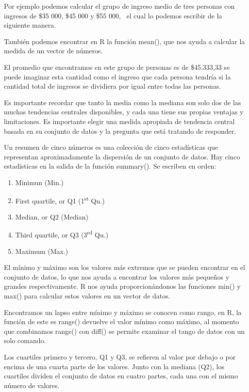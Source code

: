 \documentclass[
  letterpaper,
  DIV=11,
  numbers=noendperiod]{scrartcl}
\providecommand{\tightlist}{%
  \setlength{\itemsep}{0pt}\setlength{\parskip}{0pt}}\usepackage{longtable,booktabs,array}
\begin{document}
Por ejemplo podemos calcular el grupo de ingreso medio de tres personas
con ingresos de \$35 000, \$45 000 y \$55 000,~ el cual lo podemos
escribir de la siguiente manera.

También podemos encontrar en R la función mean(), que nos ayuda a
calcular la medida de un vector de números.

El promedio que encontramos en este grupo de personas es de \$45.333,33
se puede imaginar esta cantidad como el ingreso que cada persona tendría
si la cantidad total de ingresos se dividiera por igual entre todas las
personas.

Es importante recordar que tanto la media como la mediana son solo dos
de las muchas tendencias centrales disponibles, y cada una tiene sus
propias ventajas y limitaciones. Es importante elegir una medida
apropiada de tendencia central basada en su conjunto de datos y la
pregunta que está tratando de responder.

Un resumen de cinco números es una colección de cinco estadísticas que
representan aproximadamente la dispersión de un conjunto de datos. Hay
cinco estadísticas en la salida de la función summary(). Se escriben en
orden:

\begin{enumerate}
\def\labelenumi{\arabic{enumi}.}
\tightlist
\item
  Minimun (Min.)
\item
  First quartile, or Q1 (1\textsuperscript{st} Qu.)
\item
  Median, or Q2 (Median)
\item
  Third quartile, or Q3 (3\textsuperscript{rd} Qu.)
\item
  Maximum (Max.)
\end{enumerate}

El mínimo y máximo son los valores más extremos que se pueden encontrar
en el conjunto de datos, lo que nos ayuda a encontrar los valores más
pequeños y grandes respectivamente. R nos ayuda proporcionándonos las
funciones min() y max() para calcular estos valores en un vector de
datos.

Encontramos un lapso entre mínimo y máximo se conocen como rango, en R,
la función de este es range() devuelve el valor mínimo como máximo, al
momento que combinamos range() con diff() se permite examinar el tango
de datos con un solo comando.

Los cuartiles primero y tercero, Q1 y Q3, se refieren al valor por
debajo o por encima de una cuarta parte de los valores. Junto con la
mediana (Q2), los cuartiles dividen el conjunto de datos en cuatro
partes, cada una con el mismo número de valores.
\end{document}
